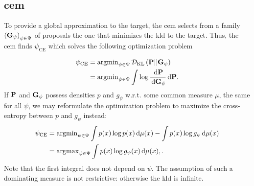 \subsection{\texorpdfstring{\Acrfull{cem}}{Cross-entropy method}}
To provide a global approximation to the target, the \gls{cem}\cite{Rubinstein1999CrossEntropy,Rubinstein2004CrossEntropy} selects from a family $ \left( \G_{\psi} \right)_{\psi \in \Psi}$ of proposals the one that minimizes the \gls{kld} to the target. Thus, the \gls{cem} finds $\psi_{\text{CE}}$ which solves the following optimization problem

\begin{align*}
    \psi_{\text{CE}} &= \argmin_{\psi \in \Psi} \Dkl{\P}{\G_{\psi}} \\
    &= \argmin_{\psi \in \Psi} \int \log \frac{\d \P}{\d\G_{\psi}} \d \P.
\end{align*}
If $\P$ and $\G_{\psi}$ possess densities $p$ and $g_{\psi}$ w.r.t. some common measure $\mu$, the same for all $\psi$, we may reformulate the optimization problem to maximize the cross-entropy between $p$ and $g_{\psi}$ instead:
\begin{align}
    \psi_{\text{CE}} &= \argmin_{\psi \in \Psi} \int  p(x)\log p(x) \d \mu(x) - \int p(x)\log g_{\psi} \d \mu(x) \nonumber\\ 
    &= \argmax_{\psi \in \Psi} \int p(x) \log g_{\psi}(x) \d \mu(x), \label{eq:ce_argmax}.
\end{align}
Note that the first integral does not depend on $\psi$. The assumption of such a dominating measure is not restrictive: otherwise the \gls{kld} is infinite. 

